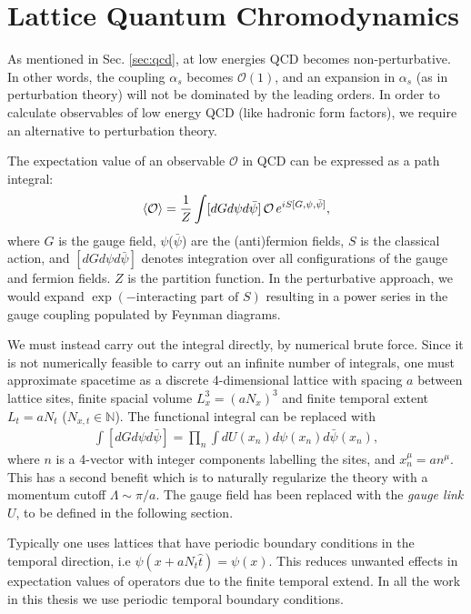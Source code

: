 \chapter{Lattice Quantum Chromodynamics}
\label{chap:latticeqcd}

As mentioned in Sec. \ref{sec:qcd}, at low energies QCD becomes non-perturbative. In other words, the coupling $\alpha_s$ becomes $\mathcal{O}(1)$, and an expansion in $\alpha_s$ (as in perturbation theory) will not be dominated by the leading orders. In order to calculate observables of low energy QCD (like hadronic form factors), we require an alternative to perturbation theory.

The expectation value of an observable $\mathcal{O}$ in QCD can be expressed as a path integral:
\begin{align}
  \langle \mathcal{O} \rangle = {1\over Z}\int [dG d\psi d\bar{\psi}] \, \mathcal{O} \, e^{iS[G,\psi,\bar{\psi}]},
\end{align}
where $G$ is the gauge field, $\psi$($\bar{\psi}$) are the (anti)fermion fields, $S$ is the classical action, and $[dG d\psi d\bar{\psi}]$ denotes integration over all configurations of the gauge and fermion fields. $Z$ is the partition function. In the perturbative approach, we would expand $\exp(-\text{interacting part of }S )$ resulting in a power series in the gauge coupling populated by Feynman diagrams.

We must instead carry out the integral directly, by numerical brute force. Since it is not numerically feasible to carry out an infinite number of integrals, one must approximate spacetime as a discrete 4-dimensional lattice with spacing $a$ between lattice sites, finite spacial volume $L_x^3=(aN_x)^3$ and finite temporal extent $L_t=aN_t$ ($N_{x,t}\in \mathbb{N}$). The functional integral can be replaced with
\begin{align}
  \int [dG d\psi d\bar{\psi}] = \prod_{n} \int dU(x_n) d\psi(x_n) d\bar{\psi}(x_n),
\end{align}
where $n$ is a 4-vector with integer components labelling the sites, and $x_n^{\mu} = an^{\mu}$.
This has a second benefit which is to naturally regularize the theory with a momentum cutoff $\Lambda \sim \pi/a$. The gauge field has been replaced with the {\it{gauge link}} $U$, to be defined in the following section.

Typically one uses lattices that have periodic boundary conditions in the temporal direction, i.e $\psi(x+aN_t \hat{t}) = \psi(x)$. This reduces unwanted effects in expectation values of operators due to the finite temporal extend. In all the work in this thesis we use periodic temporal boundary conditions.


